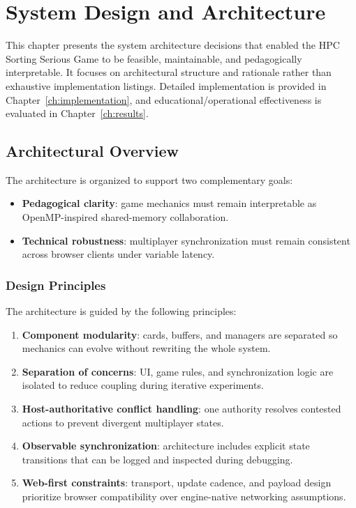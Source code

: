 \chapter{System Design and Architecture}
\label{ch:architecture}

This chapter presents the system architecture decisions that enabled the HPC Sorting Serious Game to be feasible, maintainable, and pedagogically interpretable. It focuses on architectural structure and rationale rather than exhaustive implementation listings. Detailed implementation is provided in Chapter~\ref{ch:implementation}, and educational/operational effectiveness is evaluated in Chapter~\ref{ch:results}.

\section{Architectural Overview}
\label{sec:architectural-overview}

The architecture is organized to support two complementary goals:
\begin{itemize}
    \item \textbf{Pedagogical clarity}: game mechanics must remain interpretable as OpenMP-inspired shared-memory collaboration.
    \item \textbf{Technical robustness}: multiplayer synchronization must remain consistent across browser clients under variable latency.
\end{itemize}

\subsection{Design Principles}
\label{subsec:design-principles}

The architecture is guided by the following principles:
\begin{enumerate}
    \item \textbf{Component modularity}: cards, buffers, and managers are separated so mechanics can evolve without rewriting the whole system.
    \item \textbf{Separation of concerns}: UI, game rules, and synchronization logic are isolated to reduce coupling during iterative experiments.
    \item \textbf{Host-authoritative conflict handling}: one authority resolves contested actions to prevent divergent multiplayer states.
    \item \textbf{Observable synchronization}: architecture includes explicit state transitions that can be logged and inspected during debugging.
    \item \textbf{Web-first constraints}: transport, update cadence, and payload design prioritize browser compatibility over engine-native networking assumptions.
\end{enumerate}

